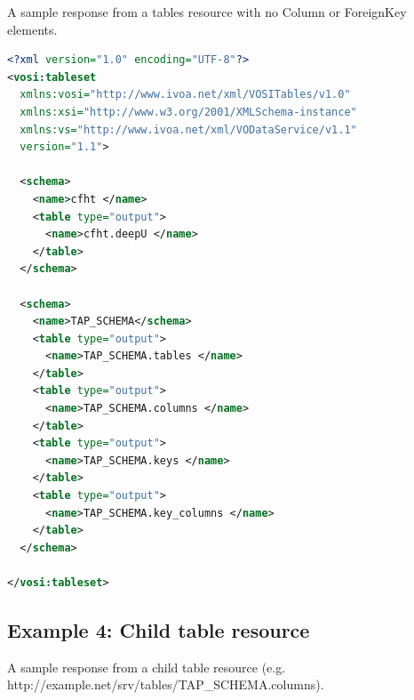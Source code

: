\documentclass[11pt,letter]{ivoa}
\begin{document}
A sample response from a tables resource with no Column or ForeignKey elements.

\begin{lstlisting}[language=XML]
<?xml version="1.0" encoding="UTF-8"?>
<vosi:tableset
  xmlns:vosi="http://www.ivoa.net/xml/VOSITables/v1.0"
  xmlns:xsi="http://www.w3.org/2001/XMLSchema-instance"
  xmlns:vs="http://www.ivoa.net/xml/VODataService/v1.1"
  version="1.1">

  <schema>
    <name>cfht </name>
    <table type="output">
      <name>cfht.deepU </name>
    </table>
  </schema>
  
  <schema>
    <name>TAP_SCHEMA</schema>
    <table type="output">
      <name>TAP_SCHEMA.tables </name>
    </table>
    <table type="output">
      <name>TAP_SCHEMA.columns </name>
    </table>
    <table type="output">
      <name>TAP_SCHEMA.keys </name>
    </table>
    <table type="output">
      <name>TAP_SCHEMA.key_columns </name>
    </table>
  </schema>

</vosi:tableset>
\end{lstlisting}

\subsection{Example 4: Child table resource}

A sample response from a child table resource (e.g. http://example.net/srv/tables/TAP\_SCHEMA.columns).
\end{document}
